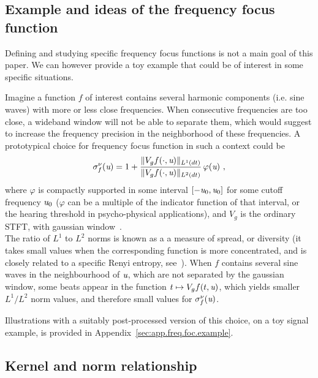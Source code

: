 \subsection{Example and ideas of the frequency focus function}\label{ssec_frequency_focus_function}
Defining and studying specific frequency focus functions is not a main goal of this paper. We can however provide a toy example that could be of interest in some specific situations.
\begin{example}
\label{ex:frequency_focus}
	Imagine a function $f$ of interest contains several harmonic components (i.e. sine waves) with more or less close frequencies. When consecutive frequencies are too close, a wideband window will not be able to separate them, which would suggest to increase the frequency precision in the neighborhood of these frequencies. A prototypical choice for frequency focus function in such a context could be
	\begin{equation}
 \label{fo:ex.freq.foc}
		\sigma_f^\nu(\u) = 1 + \frac{\|V_gf(\cdot,\u)\|_{L^1(dt)}}{\|V_gf(\cdot,\u)\|_{L^2(dt)}}\,\varphi(\u)\ ,
	\end{equation}
	where $\varphi$ is compactly supported in some interval $[-\textit{u}_0,\textit{u}_0]$ for some cutoff frequency $\textit{u}_0$ ($\varphi$ can be a multiple of the indicator function of that interval, or the hearing threshold in psycho-physical applications), and $V_g$ is the ordinary STFT, with gaussian window~\cite{grochenig2013foundations}.\\
	The ratio of $L^1$ to $L^2$ norms is known as a a measure of spread, or diversity (it takes small values when the corresponding function is more concentrated, and is closely related to a specific Renyi entropy, see~\cite{Ricaud2013refined}). When $f$ contains several sine waves in the neighbourhood of $\textit{u}$, which are not separated by the gaussian window, some beats appear in the function $t\mapsto V_gf(t,\textit{u})$, which yields smaller $L^1/L^2$ norm values, and therefore small values for $\sigma_f^\nu(\textit{u})$.

\smallskip
Illustrations with a suitably post-processed version of this choice, on a toy signal example, is provided in Appendix~\ref{sec:app.freq.foc.example}.
%

\end{example}
\subsection{Kernel and norm relationship}

